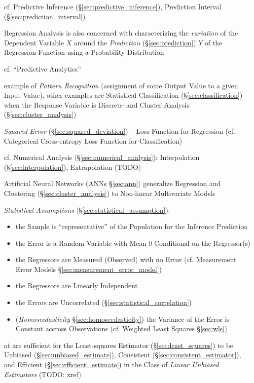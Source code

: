 \fist cf. Predictive Inference (\S\ref{sec:predictive_inference}),
Prediction Interval (\S\ref{sec:prediction_interval})

Regression Analysis is also concerned with characterizing the \emph{variation}
of the Dependent Variable $X$ around the \emph{Prediction}
(\S\ref{sec:prediction}) $Y$ of the Regression Function using a Probability
Distribution

cf. ``Predictive Analytics''

example of \emph{Pattern Recognition} (assignment of some Output Value to a
given Input Value), other examples are Statistical Classification
(\S\ref{sec:classification})--when the Response Variable is
Discrete--and Cluster Analysis (\S\ref{sec:cluster_analysis})

\emph{Squared Error} (\S\ref{sec:squared_deviation}) -- Loss Function for
Regression (cf. Categorical Cross-entropy Loss Function for Classification)

cf. Numerical Analysis (\S\ref{sec:numerical_analysis}): Interpolation
(\S\ref{sec:interpolation}), Extrapolation (TODO)

\fist Artificial Neural Networks (ANNs \S\ref{sec:ann}) generalize Regression
and Clustering (\S\ref{sec:cluster_analysis}) to Non-linear Multivariate Models

\emph{Statistical Assumptions} (\S\ref{sec:statistical_assumption}):
\begin{itemize}
  \item the Sample is ``representative'' of the Population for the Inference
    Prediction
  \item the Error is a Random Variable with Mean $0$ Conditional on the
    Regressor(s)
  \item the Regressors are Measured (Observed) with no Error (cf. Measurement
    Error Models \S\ref{sec:measurement_error_model})
  \item the Regressors are Linearly Independent
  \item the Errors are Uncorrelated (\S\ref{sec:statistical_correlation})
  \item (\emph{Homoscedasticity} \S\ref{sec:homoscedasticity}) the Variance of
    the Error is Constant accross Observations (cf. Weighted Least Squares
    \S\ref{sec:wls})
\end{itemize}
at are sufficient for the Least-squares Estimator (\S\ref{sec:least_squares}) to
be Unbiased (\S\ref{sec:unbiased_estimate}), Consistent
(\S\ref{sec:consistent_estimator}), and Efficient
(\S\ref{sec:efficient_estimate}) in the Class of \emph{Linear Unbiased
  Estimators} (TODO: xref)

